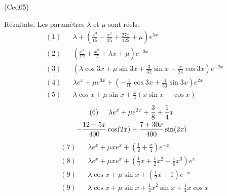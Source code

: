 \begin{tiny}(Ced05)\end{tiny} Résultats. Les paramètres $\lambda$ et $\mu$ sont réels.
\begin{align*}
 &(1)& &\lambda +\left(\frac{x^3}{15}-\frac{x^2}{25}+\frac{27x}{125} +\mu\right)e^{5x} \\
 &(2)& &\left(\frac{x^4}{12}+\frac{x^2}{2}+\lambda x +\mu \right)e^{-3x} \\
&(3)& &\left(\lambda \cos 3x +\mu \sin 3x +\frac{3}{32}\sin x +\frac{x}{24}\cos 3x \right)e^{-2x}\\
&(4)& &\lambda e^{x} + \mu e^{3x}+\left(-\frac{x}{10}\cos 3x + \frac{3}{50}\sin 3x\right)e^{2x}\\
&(5)& &\lambda \cos x + \mu \sin x +\frac{x}{4}\left(x\sin x +\cos x \right)
\end{align*}
\begin{multline*}
 (6)\hspace{0.5cm} \lambda e^x + \mu e^{2x} +\frac{3}{8} + \frac{1}{4}x\\
 -\frac{12+5x}{400}\cos(2x) -\frac{7+30x}{400}\sin(2x)
\end{multline*}
\begin{align*}
 &(7)& &\lambda e^x + \mu x e^{x} + \left( \frac{1}{2} +\frac{x}{4}\right) e^{-x} \\
 &(8)& &\lambda e^x + \mu x e^{x} + \left( \frac{1}{3}x +\frac{1}{2}x^2 + \frac{1}{6}x^3\right) e^{x}\\
 &(9)& &\lambda \cos x + \mu \sin x +\left( \frac{1}{2}x+1\right) e^{-x} \\
 &(9)& &\lambda \cos x + \mu \sin x + \frac{1}{4}x^2\sin x + \frac{1}{4}x\cos x 
\end{align*}